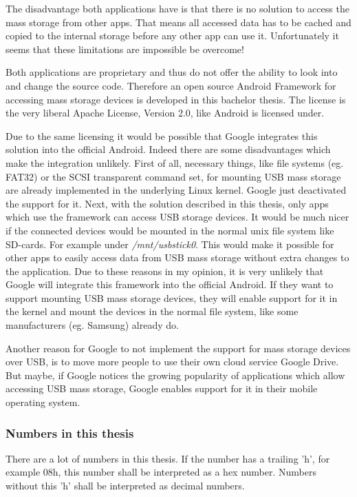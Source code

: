 The disadvantage both applications have is that there is no solution to access the mass storage from other apps. That means all accessed data has to be cached and copied to the internal storage before any other app can use it. Unfortunately it seems that these limitations are impossible be overcome!

Both applications are proprietary and thus do not offer the ability to look into and change the source code. Therefore an open source Android Framework for accessing mass storage devices is developed in this bachelor thesis. The license is the very liberal Apache License, Version 2.0, like Android is licensed under.

Due to the same licensing it would be possible that Google integrates this solution into the official Android. Indeed there are some disadvantages which make the integration unlikely. First of all, necessary things, like file systems (eg. FAT32) or the SCSI transparent command set, for mounting USB mass storage are already implemented in the underlying Linux kernel. Google just deactivated the support for it. Next, with the solution described in this thesis, only apps which use the framework can access USB storage devices. It would be much nicer if the connected devices would be mounted in the normal unix file system like SD-cards. For example under \textit{/mnt/usbstick0}. This would make it possible for other apps to easily access data from USB mass storage without extra changes to the application. Due to these reasons in my opinion, it is very unlikely that Google will integrate this framework into the official Android. If they want to support mounting USB mass storage devices, they will enable support for it in the kernel and mount the devices in the normal file system, like some manufacturers (eg. Samsung) already do.

Another reason for Google to not implement the support for mass storage devices over USB, is to move more people to use their own cloud service Google Drive. But maybe, if Google notices the growing popularity of applications which allow accessing USB mass storage, Google enables support for it in their mobile operating system.

\subsubsection{Numbers in this thesis}

There are a lot of numbers in this thesis. If the number has a trailing 'h', for example 08h, this number shall be interpreted as a hex number. Numbers without this 'h' shall be interpreted as decimal numbers.

